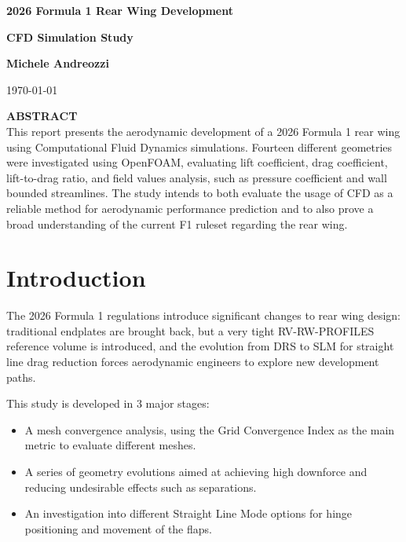 \documentclass[12pt,a4paper]{article}
\begin{document}
\begin{center}
    \vspace*{2cm}
    {\fontsize{24}{28}\selectfont\bfseries\color{primary} 2026 Formula 1 Rear Wing Development \par}
    \vspace{0.5cm}
    {\Large\bfseries\color{accent} CFD Simulation Study \par}
    \vspace{1.5cm}
    {\large \textbf{Michele Andreozzi} \par}
    \vspace{0.2cm}
    {\normalsize \today \par}
    \vspace{1.5cm}
\end{center}

\begin{center}
\begin{minipage}{0.85\textwidth}
\textbf{\color{primary}ABSTRACT}\vspace{0.2cm}\\
\small This report presents the aerodynamic development of a 2026 Formula 1 rear wing using Computational Fluid Dynamics simulations. Fourteen different geometries were investigated using OpenFOAM, evaluating lift coefficient, drag coefficient, lift-to-drag ratio, and field values analysis, such as pressure coefficient and wall bounded streamlines. The study intends to both evaluate the usage of CFD as a reliable method for aerodynamic performance prediction and to also prove a broad understanding of the current F1 ruleset regarding the rear wing.
\end{minipage}
\end{center}
\vspace{1cm}

\section{Introduction}

The 2026 Formula 1 regulations introduce significant changes to rear wing design: traditional endplates are brought back, but a very tight RV-RW-PROFILES reference volume is introduced, and the evolution from DRS to SLM for straight line drag reduction forces aerodynamic engineers to explore new development paths.

This study is developed in 3 major stages:

\begin{itemize}
    \item A mesh convergence analysis, using the Grid Convergence Index as the main metric to evaluate different meshes.
    \item A series of geometry evolutions aimed at achieving high downforce and reducing undesirable effects such as separations.
    \item An investigation into different Straight Line Mode options for hinge positioning and movement of the flaps.
\end{itemize}
\end{document}
